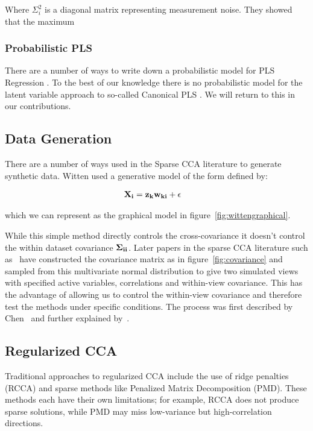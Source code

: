 Where \(\Sigma_i^2\) is a diagonal matrix representing measurement noise. They showed that the maximum

\subsubsection{Probabilistic PLS}

There are a number of ways to write down a probabilistic model for PLS Regression \cite{el2018probabilistic,zheng2016probabilistic}.
To the best of our knowledge there is no probabilistic model for the latent variable approach to so-called Canonical PLS
. We will return
to this in our contributions.

\subsection{Data Generation}\label{subsec:data-generation-background}

There are a number of ways used in the Sparse CCA literature to generate synthetic data.
Witten\cite{witten2009extensions} used a generative model of the form defined by:

\begin{align}\label{eq:wittengen}
    & \bold{X_i}=\bold{z_kw_{ki}}+\epsilon
\end{align}

which we can represent as the graphical model in figure~\ref{fig:wittengraphical}.

While this simple method directly controls the cross-covariance it doesn't control the within dataset covariance $\bold{\Sigma_{ii}}$.
Later papers in the sparse CCA literature such as~\cite{mai2019iterative,chen2013sparse} have constructed the covariance matrix as in figure~\ref{fig:covariance} and sampled from this multivariate normal distribution to give two simulated views with specified active variables, correlations and within-view covariance.
This has the advantage of allowing us to control the within-view covariance and therefore test the methods under specific conditions.
The process was first described by Chen~\cite{chen2013sparse} and further explained by~\cite{suo2017sparse}.


\subsection{Regularized CCA}\label{subsec:regularized-cca}
Traditional approaches to regularized CCA include the use of ridge penalties (RCCA) and sparse methods like Penalized Matrix Decomposition (PMD). These methods each have their own limitations; for example, RCCA does not produce sparse solutions, while PMD may miss low-variance but high-correlation directions.


